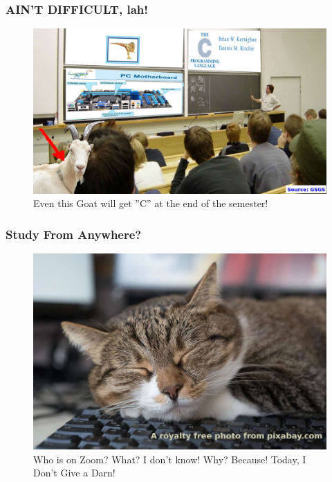 \documentclass[aspectratio=169, xcolor=table, notheorems, hyperref={pdfpagelabels=false}]{beamer}
\begin{document}
\begin{frame}[fragile]
\frametitle{AIN'T DIFFICULT, lah!}
\begin{figure}
\includegraphics[width=0.79\linewidth]{os-kambing-kuliah-c}
\caption{Even this Goat will get ''C'' at the end of the semester!}
\end{figure}
\end{frame}

\begin{frame}[fragile]
\frametitle{Study From Anywhere?}
\begin{figure}
\includegraphics[width=0.64\linewidth]{os-cat}
\caption{Who is on Zoom? What? I don't know! Why? Because! Today, I Don't Give a Darn!}
\end{figure}
\end{frame}
\end{document}

